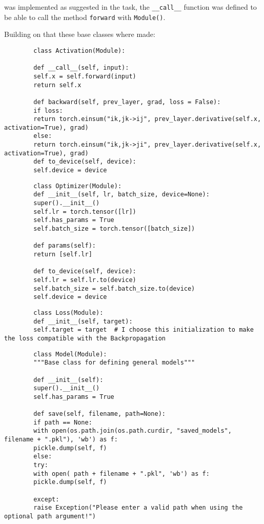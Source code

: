 \documentclass[11pt,english]{article}
\begin{document}
	was implemented as suggested in the task, the \lstinline|__call__| function was defined to be able to call the method \lstinline|forward| with \lstinline|Module()|.
	
	Building on that these base classes where made: 
	
	\begin{lstlisting}
		class Activation(Module):
		
		def __call__(self, input):
		self.x = self.forward(input)
		return self.x
		
		def backward(self, prev_layer, grad, loss = False):
		if loss:
		return torch.einsum("ik,jk->ij", prev_layer.derivative(self.x, activation=True), grad) 
		else:
		return torch.einsum("ik,jk->ji", prev_layer.derivative(self.x, activation=True), grad) 
		def to_device(self, device):
		self.device = device
	\end{lstlisting}
	
	\begin{lstlisting}
		class Optimizer(Module):
		def __init__(self, lr, batch_size, device=None):
		super().__init__()
		self.lr = torch.tensor([lr])
		self.has_params = True
		self.batch_size = torch.tensor([batch_size])
		
		def params(self):
		return [self.lr]
		
		def to_device(self, device):
		self.lr = self.lr.to(device)
		self.batch_size = self.batch_size.to(device)
		self.device = device
	\end{lstlisting}	
	
	\begin{lstlisting}
		class Loss(Module):
		def __init__(self, target):
		self.target = target  # I choose this initialization to make the loss compatible with the Backpropagation 
	\end{lstlisting} 
	
	\begin{lstlisting}
		class Model(Module):
		"""Base class for defining general models"""
		
		def __init__(self):
		super().__init__()
		self.has_params = True
		
		def save(self, filename, path=None):
		if path == None:
		with open(os.path.join(os.path.curdir, "saved_models", filename + ".pkl"), 'wb') as f:
		pickle.dump(self, f)
		else:
		try:
		with open( path + filename + ".pkl", 'wb') as f:
		pickle.dump(self, f)
		
		except:
		raise Exception("Please enter a valid path when using the optional path argument!")
	\end{lstlisting}
	
\end{document}
